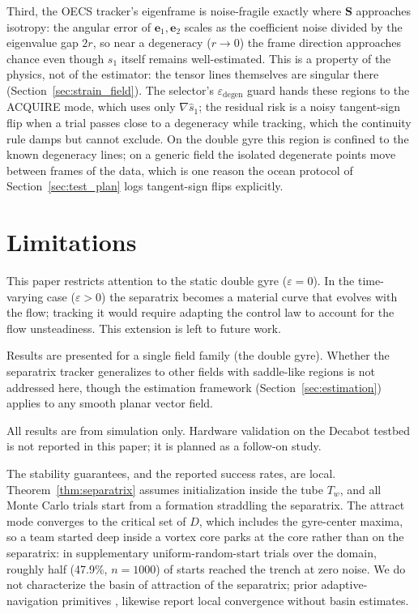 \documentclass[lettersize,journal]{IEEEtran}
\begin{document}
Third, the OECS tracker's eigenframe is noise-fragile exactly where
$\mathbf{S}$ approaches isotropy: the angular error of
$\mathbf{e}_1, \mathbf{e}_2$ scales as the coefficient noise divided by
the eigenvalue gap $2r$, so near a degeneracy ($r \to 0$) the frame
direction approaches chance even though $s_1$ itself remains
well-estimated. This is a property of the physics, not of the
estimator: the tensor lines themselves are singular there
(Section~\ref{sec:strain_field}). The selector's
$\varepsilon_{\text{degen}}$ guard hands these regions to the ACQUIRE
mode, which uses only $\nabla\hat{s}_1$; the residual risk is a noisy
tangent-sign flip when a trial passes close to a degeneracy while
tracking, which the continuity rule damps but cannot exclude. On the
double gyre this region is confined to the known degeneracy lines; on a
generic field the isolated degenerate points move between frames of the
data, which is one reason the ocean protocol of
Section~\ref{sec:test_plan} logs tangent-sign flips explicitly.


\section{Limitations}
\label{sec:limitations}

This paper restricts attention to the static double gyre ($\varepsilon = 0$).
In the time-varying case ($\varepsilon > 0$) the separatrix becomes a
material curve that evolves with the flow; tracking it would require
adapting the control law to account for the flow unsteadiness. This
extension is left to future work.

Results are presented for a single field family (the double gyre). Whether
the separatrix tracker generalizes to other fields with saddle-like
regions is not addressed here, though the estimation framework
(Section~\ref{sec:estimation}) applies to any smooth planar vector field.

All results are from simulation only. Hardware validation on the Decabot
testbed is not reported in this paper; it is planned as a follow-on study.

The stability guarantees, and the reported success rates, are local.
Theorem~\ref{thm:separatrix} assumes initialization inside the tube
$T_w$, and all Monte Carlo trials start from a formation straddling the
separatrix. The attract mode converges to the critical set of $D$, which
includes the gyre-center maxima, so a team started deep inside a vortex
core parks at the core rather than on the separatrix: in supplementary
uniform-random-start trials over the domain, roughly half (47.9\%,
$n = 1000$) of starts reached the trench at zero noise. We do not
characterize the basin of attraction of the separatrix; prior
adaptive-navigation primitives \cite{27}, \cite{28} likewise report local
convergence without basin estimates.
\end{document}
